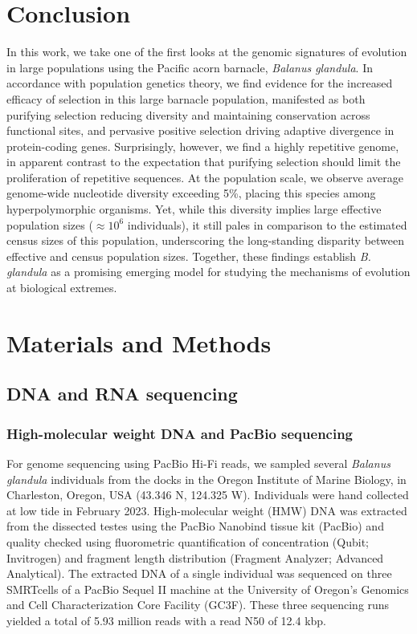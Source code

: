 \documentclass[11pt]{article}
\newcommand{\balgla}{\textit{Balanus glandula}\xspace}
\newcommand{\bgla}{\textit{B. glandula}\xspace}
\begin{document}
\section*{Conclusion}

In this work, we take one of the first looks at the genomic signatures of evolution
in large populations using the Pacific acorn barnacle, \balgla{}.
In accordance with population genetics theory, we find evidence for the increased
efficacy of selection in this large barnacle population, manifested as both purifying
selection reducing diversity and maintaining conservation across functional sites, and
pervasive positive selection driving adaptive divergence in protein-coding genes.
Surprisingly, however, we find a highly repetitive genome, in apparent contrast to
the expectation that purifying selection should limit the proliferation of repetitive
sequences.
At the population scale, we observe average genome-wide
nucleotide diversity exceeding 5\%, placing this species among hyperpolymorphic
organisms.
Yet, while this diversity implies large effective population sizes ($\approx10^{6}$
individuals), it still pales in comparison to the estimated census sizes
of this population, underscoring the long-standing disparity between effective
and census population sizes.
Together, these findings establish \bgla{} as a promising emerging model for studying
the mechanisms of evolution at biological extremes.

\section*{Materials and Methods}


\subsection*{DNA and RNA sequencing}

\subsubsection*{High-molecular weight DNA and PacBio sequencing}

For genome sequencing using PacBio Hi-Fi reads, we sampled several \balgla{}
individuals from the docks in the Oregon Institute of Marine Biology, in Charleston,
Oregon, USA (43.346 N, 124.325 W). Individuals were hand collected at low tide in
February 2023. High-molecular weight (HMW) DNA was extracted from the dissected
testes using the PacBio Nanobind tissue kit (PacBio) and quality checked using
fluorometric quantification of concentration (Qubit; Invitrogen) and fragment
length distribution (Fragment Analyzer; Advanced Analytical). The extracted DNA
of a single individual was sequenced on three SMRTcells of a PacBio Sequel
II machine at the University of Oregon's Genomics and Cell Characterization Core
Facility (GC3F). These three sequencing runs yielded a total of 5.93 million
reads with a read N50 of 12.4 kbp.
\end{document}
